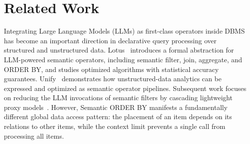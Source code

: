 \section{Related Work}
 \label{sec:relatedwork}

Integrating Large Language Models (LLMs) as first-class operators inside DBMS has become an important direction in declarative query processing over structured and unstructured data. 
Lotus~\cite{DBLP:journals/pvldb/PatelJPGAGZ25} introduces a formal abstraction for LLM-powered semantic operators, including semantic filter, join, aggregate, and \textsf{ORDER BY}, and studies optimized algorithms with statistical accuracy guarantees.
Unify~\cite{DBLP:journals/pvldb/WangLWXL25} demonstrates how unstructured-data analytics can be expressed and optimized as semantic operator pipelines.
Subsequent work focuses on reducing the LLM invocations of semantic filters by cascading lightweight proxy models~\cite{DBLP:journals/pacmmod/ZeighamiSP25, DBLP:journals/corr/abs-2509-12610, DBLP:journals/corr/abs-2601-05536}.
However, Semantic \textsf{ORDER BY} manifests a fundamentally different global data access pattern: the placement of an item depends on its relations to other items, while the context limit prevents a single call from processing all items. 




